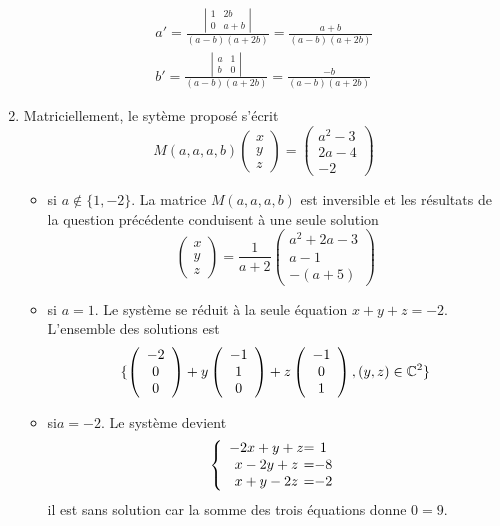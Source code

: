 \begin{enumerate}
\begin{eqnarray*}
a'=\frac
{\left |
\begin{array}{cc}
1 & 2b\\
0 & a+b 
\end{array}
\right |
}
{(a-b)(a+2b)}
=\frac{a+b}{(a-b)(a+2b)}\\
b'=\frac
{\left |
\begin{array}{cc}
a & 1\\
b & 0 
\end{array}
\right |
}
{(a-b)(a+2b)}
=\frac{-b}{(a-b)(a+2b)}
\end{eqnarray*}
\item Matriciellement, le sytème proposé s'écrit
\[M(a,a,a,b)
\left (\begin{array}{c}x\\y\\z\end{array}\right )
=\left (\begin{array}{c}a^{2}-3\\2a-4\\-2\end{array}\right )
\]
\begin{itemize}
\item si $a\not \in \{1,-2\}$. La matrice $M(a,a,a,b)$ est inversible et les résultats de la question précédente conduisent à une seule solution
\[
\left (\begin{array}{c}x\\y\\z\end{array}\right )
=\frac{1}{a+2}
\left (\begin{array}{c}a^{2}+2a-3\\a-1\\-(a+5)\end{array}\right )
\]
\item si $a=1$. Le système se réduit à la seule équation $x+y+z=-2$. L'ensemble des solutions est 
\[
\{\left (\begin{array}{c}-2\\0\\0\end{array}\right )
+y\left (\begin{array}{c}-1\\1\\0\end{array}\right )
+z\left (\begin{array}{c}-1\\0\\1\end{array}\right )
,(y,z)\in \mathbb{C}^{2}
\}\]
\item si$a=-2$. Le système devient
\[\left\{
\begin{array}{c@=c}
-2x+y+z&1\\
x-2y+z&-8\\
x+y-2z&-2
\end{array}
\right.
\]
il est sans solution car la somme des trois équations donne $0=9$.
\end{itemize}
\end{enumerate}


